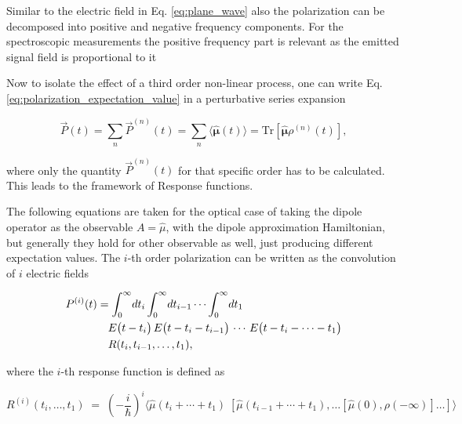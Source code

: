 \noindent
Similar to the electric field in Eq. \eqref{eq:plane_wave} also the polarization can be decomposed into positive and negative frequency components. For the spectroscopic measurements the positive frequency part is relevant as the emitted signal field is proportional to it  \cite{mukamel1995principlesnonlinearoptical}


\noindent
Now to isolate the effect of a third order non-linear process, one can write Eq. \eqref{eq:polarization_expectation_value} in a perturbative series expansion

\begin{equation}
	\vec{P}(t) = \sum_n \vec{P}^{(n)}(t) = \sum_n \langle \mathbf{\hat{\mu}}(t) \rangle = \mathrm{Tr}[\mathbf{\hat{\mu}} \rho^{(n)}(t)],
	\label{eq:polarization_expectation_value_perturbative}
\end{equation}


\noindent
where only the quantity $\vec{P}^{(n)}(t)$ for that specific order has to be calculated.
This leads to the framework of Response functions. 

\noindent
The following equations are taken for the optical case of taking the dipole operator as the observable $A = \hat{\mu}$, with the dipole approximation Hamiltonian, but generally they hold for other observable as well, just producing different expectation values. 
The $i$-th order polarization can be written as the convolution of $i$ electric fields \cite{hamm2005principlesnonlinearoptical}

\begin{align}
	P^{(i)}(t) &= \int_{0}^{\infty}\! dt_{i} \int_{0}^{\infty}\! dt_{i-1} \cdots \int_{0}^{\infty}\! dt_{1} \notag \\
	&\quad E\bigl(t-t_{i}\bigr)\, E\bigl(t-t_{i}-t_{i-1}\bigr)\,\cdots\, E\bigl(t-t_{i}-\cdots - t_{1}\bigr) \notag \\
	&\quad R(t_{i},t_{i-1},\ldots,t_{1}),
	\label{eq:response_convolution}
\end{align}

\noindent
where the $i$-th response function is defined as

\begin{equation}
	R^{(i)}(t_{i},\ldots,t_{1})
	\;=\;
	\left(-\frac{i}{\hbar}\right)^{i}
	\Big\langle
	\hat{\mu}(t_{i}+\cdots + t_{1})\;[\hat{\mu}(t_{i-1}+\cdots + t_{1}),\ldots [\hat{\mu}(0),\rho(-\infty)]\ldots]
	\Big\rangle
	\label{eq:response_function_R}
\end{equation}

